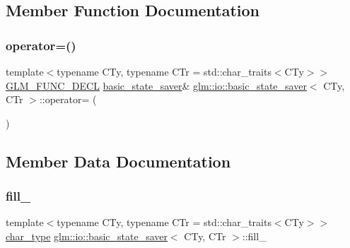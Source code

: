 \subsection{Member Function Documentation}
\mbox{\label{classglm_1_1io_1_1basic__state__saver_add3605cf6a261400ca499be074baa4db}} 
\subsubsection{\texorpdfstring{operator=()}{operator=()}}
{\footnotesize\ttfamily template$<$typename C\+Ty, typename C\+Tr = std\+::char\+\_\+traits$<$\+C\+Ty$>$$>$ \\
\mbox{\hyperlink{setup_8hpp_ab2d052de21a70539923e9bcbf6e83a51}{G\+L\+M\+\_\+\+F\+U\+N\+C\+\_\+\+D\+E\+CL}} \mbox{\hyperlink{classglm_1_1io_1_1basic__state__saver}{basic\+\_\+state\+\_\+saver}}\& \mbox{\hyperlink{classglm_1_1io_1_1basic__state__saver}{glm\+::io\+::basic\+\_\+state\+\_\+saver}}$<$ C\+Ty, C\+Tr $>$\+::operator= (\begin{DoxyParamCaption}\item[{\mbox{\hyperlink{classglm_1_1io_1_1basic__state__saver}{basic\+\_\+state\+\_\+saver}}$<$ C\+Ty, C\+Tr $>$ const \&}]{ }\end{DoxyParamCaption})\hspace{0.3cm}{\ttfamily [private]}}



\subsection{Member Data Documentation}
\mbox{\label{classglm_1_1io_1_1basic__state__saver_abf8166290d087051954306facad38e00}} 
\subsubsection{\texorpdfstring{fill\+\_\+}{fill\_}}
{\footnotesize\ttfamily template$<$typename C\+Ty, typename C\+Tr = std\+::char\+\_\+traits$<$\+C\+Ty$>$$>$ \\
\mbox{\hyperlink{classglm_1_1io_1_1basic__state__saver_ae6abb8e2e6bd4a044e953746691ffe8e}{char\+\_\+type}} \mbox{\hyperlink{classglm_1_1io_1_1basic__state__saver}{glm\+::io\+::basic\+\_\+state\+\_\+saver}}$<$ C\+Ty, C\+Tr $>$\+::fill\+\_\+\hspace{0.3cm}{\ttfamily [private]}}

